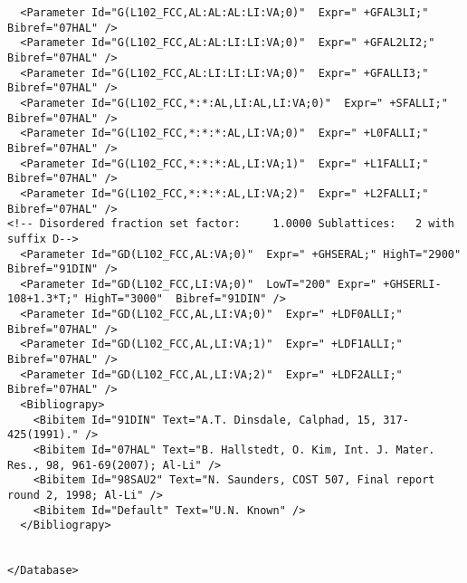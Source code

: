 \documentclass{article}
\begin{document}
\begin{appendices}
\begin{verbatim}
  <Parameter Id="G(L102_FCC,AL:AL:AL:LI:VA;0)"  Expr=" +GFAL3LI;"  Bibref="07HAL" />
  <Parameter Id="G(L102_FCC,AL:AL:LI:LI:VA;0)"  Expr=" +GFAL2LI2;"  Bibref="07HAL" />
  <Parameter Id="G(L102_FCC,AL:LI:LI:LI:VA;0)"  Expr=" +GFALLI3;"  Bibref="07HAL" />
  <Parameter Id="G(L102_FCC,*:*:AL,LI:AL,LI:VA;0)"  Expr=" +SFALLI;"  Bibref="07HAL" />
  <Parameter Id="G(L102_FCC,*:*:*:AL,LI:VA;0)"  Expr=" +L0FALLI;"  Bibref="07HAL" />
  <Parameter Id="G(L102_FCC,*:*:*:AL,LI:VA;1)"  Expr=" +L1FALLI;"  Bibref="07HAL" />
  <Parameter Id="G(L102_FCC,*:*:*:AL,LI:VA;2)"  Expr=" +L2FALLI;"  Bibref="07HAL" />
<!-- Disordered fraction set factor:     1.0000 Sublattices:   2 with suffix D-->
  <Parameter Id="GD(L102_FCC,AL:VA;0)"  Expr=" +GHSERAL;" HighT="2900"  Bibref="91DIN" />
  <Parameter Id="GD(L102_FCC,LI:VA;0)"  LowT="200" Expr=" +GHSERLI-108+1.3*T;" HighT="3000"  Bibref="91DIN" />
  <Parameter Id="GD(L102_FCC,AL,LI:VA;0)"  Expr=" +LDF0ALLI;"  Bibref="07HAL" />
  <Parameter Id="GD(L102_FCC,AL,LI:VA;1)"  Expr=" +LDF1ALLI;"  Bibref="07HAL" />
  <Parameter Id="GD(L102_FCC,AL,LI:VA;2)"  Expr=" +LDF2ALLI;"  Bibref="07HAL" />
  <Bibliograpy>
    <Bibitem Id="91DIN" Text="A.T. Dinsdale, Calphad, 15, 317-425(1991)." /> 
    <Bibitem Id="07HAL" Text="B. Hallstedt, O. Kim, Int. J. Mater. Res., 98, 961-69(2007); Al-Li" /> 
    <Bibitem Id="98SAU2" Text="N. Saunders, COST 507, Final report round 2, 1998; Al-Li" /> 
    <Bibitem Id="Default" Text="U.N. Known" /> 
  </Bibliograpy>


</Database>
\end{verbatim}

\end{appendices}
\end{document}
